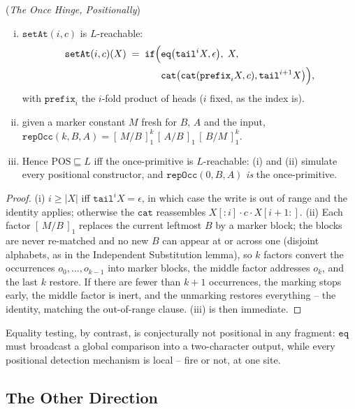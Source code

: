 \documentclass[runningheads,envcountsect]{llncs}
\begin{document}
\begin{theorem}
    (\emph{The Once Hinge, Positionally})
    \label{thm:pos-hinge}
    \begin{enumerate}[(i)]
        \item $\mathtt{setAt}(i, c)$ is $L$-reachable:
        \begin{align}
            \mathtt{setAt}(i,c)(X) \;=\; \mathtt{if}\Big(&\mathtt{eq}\big(\mathtt{tail}^i X, \epsilon\big),\; X,\notag\\
            &\mathtt{cat}\big(\mathtt{cat}(\mathtt{prefix}_i X, c), \mathtt{tail}^{i+1} X\big)\Big),
        \end{align}
        with $\mathtt{prefix}_i$ the $i$-fold product of heads ($i$ fixed, as the index is).
        \item given a marker constant $M$ fresh for $B$, $A$ and the input, $\mathtt{repOcc}(k, B, A) = [\,M/B\,]_1^k\,[\,A/B\,]_1\,[\,B/M\,]_1^k$.
        \item Hence $\mathrm{POS} \sqsubseteq L$ iff the once-primitive is $L$-reachable: (i) and (ii) simulate every positional constructor, and $\mathtt{repOcc}(0, B, A)$ \emph{is} the once-primitive.
    \end{enumerate}
\end{theorem}

\begin{proof}
    (i) $i \geq |X|$ iff $\mathtt{tail}^i X = \epsilon$, in which case the write is out of range and the identity applies; otherwise the $\mathtt{cat}$ reassembles $X[{:}i]\cdot c\cdot X[i{+}1{:}]$. (ii) Each factor $[\,M/B\,]_1$ replaces the current leftmost $B$ by a marker block; the blocks are never re-matched and no new $B$ can appear at or across one (disjoint alphabets, as in the Independent Substitution lemma), so $k$ factors convert the occurrences $o_0, \dots, o_{k-1}$ into marker blocks, the middle factor addresses $o_k$, and the last $k$ restore. If there are fewer than $k+1$ occurrences, the marking stops early, the middle factor is inert, and the unmarking restores everything -- the identity, matching the out-of-range clause. (iii) is then immediate.
\end{proof}

Equality testing, by contrast, is conjecturally not positional in any fragment: $\mathtt{eq}$ must broadcast a global comparison into a two-character output, while every positional detection mechanism is local -- fire or not, at one site.

\subsection{The Other Direction}
\label{subsec:direction}
\end{document}
